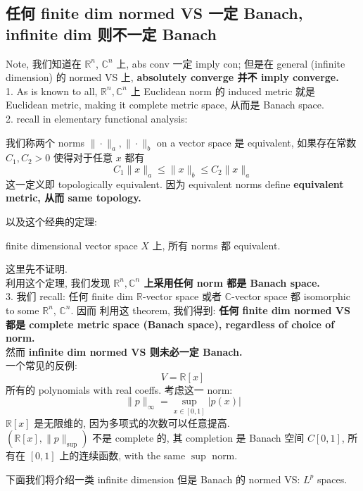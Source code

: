 \documentclass[lang=cn,11pt]{elegantbook}
\begin{document}
\subsection{任何 finite dim normed VS 一定 Banach, infinite dim 则不一定 Banach }

\begin{remark}
    Note, 我们知道在 $\mathbb{R}^n$, $\mathbb{C}^n$ 上, abs conv 一定 imply con; 但是在 general (infinite dimension) 的 normed VS 上, \textbf{absolutely converge 并不 imply converge.}\\

1. As is known to all, \(\mathbb{R}^n,\mathbb{C}^n\) 上 Euclidean norm 的 induced metric 就是 Euclidean metric, making it complete metric space, 从而是 Banach space.\\
2. recall in elementary functional analysis: 
\begin{definition}
    我们称两个 norms $\| \cdot\|_a, \| \cdot\|_b$ on a vector space 是 equivalent, 如果存在常数 \(C_1, C_2 > 0\) 使得对于任意 $x$ 都有 \[C_1\|x\|_a \leq \|x\|_b \leq C_2\|x\|_a \]
这一定义即 topologically equivalent. 因为 equivalent norms define \textbf{equivalent metric, 从而 same topology. }
\end{definition}
以及这个经典的定理:
\begin{theorem}
finite dimensional vector space $X$ 上, 所有 norms 都 equivalent.
\end{theorem}
这里先不证明. \\
利用这个定理, 我们发现 \textbf{ \(\mathbb{R}^n,\mathbb{C}^n\) 上采用任何 norm 都是 Banach space.}\\
3. 我们 recall: 任何 finite dim $\mathbb{R}$-vector space 或者 $\mathbb{C}$-vector space 都 isomorphic to some $\mathbb{R}^n$, $\mathbb{C}^n$. 因而
利用这 theorem, 我们得到: \textbf{任何 finite dim normed VS 都是 complete metric space (Banach space), regardless of choice of norm.}\\
然而\textbf{ infinite dim normed VS  则未必一定 Banach.}\\
一个常见的反例: \[
    V = \mathbb{R}[x]
  \]
所有的 polynomials with real coeffs. 考虑这一 norm:  \[
    \|p\|_{\infty} = \sup_{x \in [0,1]} |p(x)|
  \]
\(\mathbb{R}[x]\) 是无限维的, 因为多项式的次数可以任意提高.\\
$(\mathbb{R}[x], \| p\|_{\sup})$ 不是 complete 的, 其 completion 是 Banach 空间 \(C[0,1]\), 所有在 \([0,1]\) 上的连续函数, with the same \(\sup\) norm.\\
\end{remark}
下面我们将介绍一类 infinite dimension 但是 Banach 的 normed VS: $L^p$ spaces.
\end{document}
